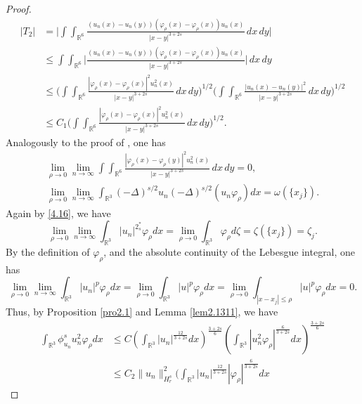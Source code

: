 \documentclass[11pt]{article}
\numberwithin{equation}{section}
\begin{document}
\begin{proof}
\[\begin{split}
|T_2|
&= \Big|\int\int_{\mathbb{R}^6}\frac{(u_n(x)-u_n(y))(\varphi_\rho(x)
 -\varphi_\rho(x))u_n(x)}{|x-y|^{3+2s}}\,dx\,dy\Big|\\
&\leq \int\int_{\mathbb{R}^6}
 \Big|\frac{(u_n(x)-u_n(y))(\varphi_\rho(x)-\varphi_\rho(x))u_n(x)}{|x-y|^{3+2s}}
 \Big|\,dx\,dy\\
&\leq \Big(\int\int_{\mathbb{R}^6}
 \frac{|\varphi_\rho(x)-\varphi_\rho(x)|^2u^2_{n}(x)}{|x-y|^{3+2s}}\,dx\,dy
  \Big)^{1/2}
\Big(\int\int_{\mathbb{R}^6}\frac{|u_n(x)-u_n(y)|^2}{|x-y|^{3+2s}}\,dx\,dy\Big)^{1/2}\\
&\leq C_1\Big(\int\int_{\mathbb{R}^6}\frac{|\varphi_\rho(x)-\varphi_\rho(x)
 |^2u^2_{n}(x)}{|x-y|^{3+2s}}\,dx\,dy\Big)^{1/2}.
\end{split}
\]
Analogously to the proof of \cite[Lemma 3.4]{Z1688}, one has
\begin{equation}
\begin{gathered}
\lim_{\rho\to 0}\lim_{n\to\infty}\int\int_{\mathbb{R}^6}\frac{|\varphi_\rho(x)-\varphi_\rho(y)|^2u^2_{n}(x)}
{|x-y|^{3+2s}}\,dx\,dy=0, \\
\label{4.18}
\lim_{\rho\to 0}\lim_{n\to\infty}\int_{\mathbb{R}^3}(-\Delta)^{s/2}u_n
(-\Delta)^{s/2}(u_n\varphi_\rho)dx=\omega(\{x_j\}).
\end{gathered}
\end{equation}
Again by \eqref{4.16}, we have
\begin{equation}\label{4.20}
\lim_{\rho\to 0}\lim_{n\to\infty}\int_{\mathbb{R}^3}|u_n|^{2^*_s}\varphi_\rho dx
=\lim_{\rho\to 0}\int_{\mathbb{R}^3}\varphi_\rho d\zeta=\zeta(\{x_j\})=\zeta_j.
\end{equation}
By the definition of $\varphi_\rho$, and the absolute continuity of the Lebesgue
integral, one has
\begin{equation}\label{4.21}
\lim_{\rho\to 0}\lim_{n\to\infty}\int_{\mathbb{R}^3}|u_n|^{p}\varphi_\rho dx
=\lim_{\rho\to 0}\int_{\mathbb{R}^3}|u|^{p}\varphi_\rho dx
=\lim_{\rho\to 0}\int_{|x-x_j|\leq\rho}|u|^{p}\varphi_\rho dx=0.
\end{equation}
Thus, by Proposition {\ref{pro2.1}} and Lemma \ref{lem2.1311}, we have
\begin{align*} %
\int_{\mathbb{R}^3}\phi^s_{u_n}u^2_n\varphi_\rho dx&\leq
C\left(\int_{\mathbb{R}^3}|u_n|^{\frac{12}{3+2s}}dx\right)^{\frac{3+2s}{6}}\left(\int_{\mathbb{R}^3}|u^2_n\varphi_\rho|^{\frac{6}{3+2s}}dx\right)
^{\frac{3+2s}{6}}\\
&\leq  C_2\|u_n\|^2_{H^s_r}
 \Big(\int_{\mathbb{R}^3}{|u_n|}^{\frac{12}{3+2s}}|\varphi_\rho|^{\frac{6}{3+2s}}dx

\end{align*}
\end{proof}
\end{document}
